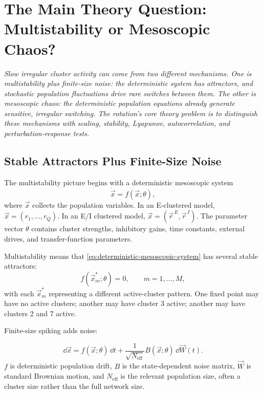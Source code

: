\chapter{The Main Theory Question: Multistability or Mesoscopic Chaos?}
\label{ch:multistability-or-mesoscopic-chaos}

\textit{Slow irregular cluster activity can come from two different mechanisms. One is multistability plus finite-size noise: the deterministic system has attractors, and stochastic population fluctuations drive rare switches between them. The other is mesoscopic chaos: the deterministic population equations already generate sensitive, irregular switching. The rotation's core theory problem is to distinguish these mechanisms with scaling, stability, Lyapunov, autocorrelation, and perturbation-response tests.}

\section{Stable Attractors Plus Finite-Size Noise}
\label{sec:stable-attractors-plus-finite-size-noise}

The multistability picture begins with a deterministic mesoscopic system
%
\begin{equation}
  \dot{\vec x}=f(\vec x;\theta),
  \label{eq:deterministic-mesoscopic-system}
\end{equation}
%
where $\vec x$ collects the population variables. In an E-clustered model, $\vec x=(r_1,\ldots,r_Q)$. In an E/I clustered model, $\vec x=(\vec r^{\,E},\vec r^{\,I})$. The parameter vector $\theta$ contains cluster strengths, inhibitory gains, time constants, external drives, and transfer-function parameters.

Multistability means that \eqref{eq:deterministic-mesoscopic-system} has several stable attractors:
%
\begin{equation}
  f(\vec x_m^*;\theta)=0,
  \qquad
  m=1,\ldots,M,
  \label{eq:multiple-fixed-points}
\end{equation}
%
with each $\vec x_m^*$ representing a different active-cluster pattern. One fixed point may have no active clusters; another may have cluster 3 active; another may have clusters 2 and 7 active.

Finite-size spiking adds noise:
%
\begin{keyequation}
\begin{equation}
  \dd \vec x
  =
  f(\vec x;\theta)\,\dd t
  +
  \frac{1}{\sqrt{N_{\mathrm{eff}}}}
  B(\vec x;\theta)\,\dd \vec W(t).
  \label{eq:finite-size-attractor-sde}
\end{equation}
\tcblower
$f$ is deterministic population drift, $B$ is the state-dependent noise matrix, $\vec W$ is standard Brownian motion, and $N_{\mathrm{eff}}$ is the relevant population size, often a cluster size rather than the full network size.
\end{keyequation}

